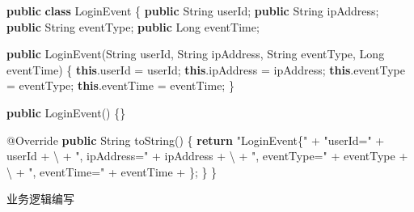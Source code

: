 \documentclass[cn,11pt,chinese]{elegantbook}
\newenvironment{Shaded}{}{}
\newcommand{\AttributeTok}[1]{\textcolor[rgb]{0.49,0.56,0.16}{#1}}
\newcommand{\BuiltInTok}[1]{#1}
\newcommand{\CharTok}[1]{\textcolor[rgb]{0.25,0.44,0.63}{#1}}
\newcommand{\FunctionTok}[1]{\textcolor[rgb]{0.02,0.16,0.49}{#1}}
\newcommand{\KeywordTok}[1]{\textcolor[rgb]{0.00,0.44,0.13}{\textbf{#1}}}
\newcommand{\NormalTok}[1]{#1}
\newcommand{\StringTok}[1]{\textcolor[rgb]{0.25,0.44,0.63}{#1}}
\begin{document}
\begin{Shaded}
\begin{Highlighting}[]
\KeywordTok{public} \KeywordTok{class}\NormalTok{ LoginEvent \{}
    \KeywordTok{public} \BuiltInTok{String}\NormalTok{ userId;}
    \KeywordTok{public} \BuiltInTok{String}\NormalTok{ ipAddress;}
    \KeywordTok{public} \BuiltInTok{String}\NormalTok{ eventType;}
    \KeywordTok{public} \BuiltInTok{Long}\NormalTok{ eventTime;}
    
    \KeywordTok{public} \FunctionTok{LoginEvent}\NormalTok{(}\BuiltInTok{String}\NormalTok{ userId, }\BuiltInTok{String}\NormalTok{ ipAddress, }\BuiltInTok{String}\NormalTok{ eventType, }\BuiltInTok{Long}\NormalTok{ eventTime) \{}
        \KeywordTok{this}\NormalTok{.}\FunctionTok{userId}\NormalTok{ = userId;}
        \KeywordTok{this}\NormalTok{.}\FunctionTok{ipAddress}\NormalTok{ = ipAddress;}
        \KeywordTok{this}\NormalTok{.}\FunctionTok{eventType}\NormalTok{ = eventType;}
        \KeywordTok{this}\NormalTok{.}\FunctionTok{eventTime}\NormalTok{ = eventTime;}
\NormalTok{    \}}
    
    \KeywordTok{public} \FunctionTok{LoginEvent}\NormalTok{() \{\}}
    
    \AttributeTok{@Override}
    \KeywordTok{public} \BuiltInTok{String} \FunctionTok{toString}\NormalTok{() \{}
        \KeywordTok{return} \StringTok{"LoginEvent\{"}\NormalTok{ +}
            \StringTok{"userId=\textquotesingle{}"}\NormalTok{ + userId + }\CharTok{\textquotesingle{}\textbackslash{}\textquotesingle{}\textquotesingle{}}\NormalTok{ +}
            \StringTok{", ipAddress=\textquotesingle{}"}\NormalTok{ + ipAddress + }\CharTok{\textquotesingle{}\textbackslash{}\textquotesingle{}\textquotesingle{}}\NormalTok{ +}
            \StringTok{", eventType=\textquotesingle{}"}\NormalTok{ + eventType + }\CharTok{\textquotesingle{}\textbackslash{}\textquotesingle{}\textquotesingle{}}\NormalTok{ +}
            \StringTok{", eventTime="}\NormalTok{ + eventTime +}
            \CharTok{\textquotesingle{}\}\textquotesingle{}}\NormalTok{;}
\NormalTok{    \}}
\NormalTok{\}}
\end{Highlighting}
\end{Shaded}

业务逻辑编写
\end{document}
